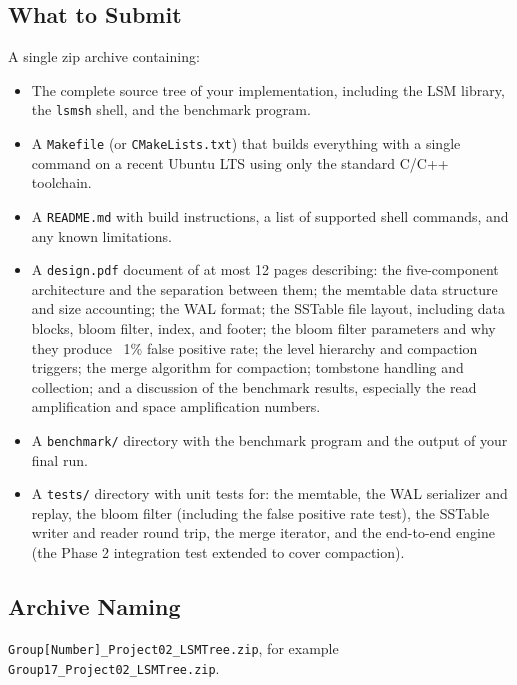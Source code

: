 \documentclass[11pt,a4paper]{article}
\begin{document}
\subsection{What to Submit}
A single zip archive containing:

\begin{itemize}
\item The complete source tree of your implementation, including the LSM library, the \texttt{lsmsh} shell, and the benchmark program.

\item A \texttt{Makefile} (or \texttt{CMakeLists.txt}) that builds everything with a single command on a recent Ubuntu LTS using only the standard C/C++ toolchain.

\item A \texttt{README.md} with build instructions, a list of supported shell commands, and any known limitations.

\item A \texttt{design.pdf} document of at most 12 pages describing: the five-component architecture and the separation between them; the memtable data structure and size accounting; the WAL format; the SSTable file layout, including data blocks, bloom filter, index, and footer; the bloom filter parameters and why they produce ~1\% false positive rate; the level hierarchy and compaction triggers; the merge algorithm for compaction; tombstone handling and collection; and a discussion of the benchmark results, especially the read amplification and space amplification numbers.

\item A \texttt{benchmark/} directory with the benchmark program and the output of your final run.

\item A \texttt{tests/} directory with unit tests for: the memtable, the WAL serializer and replay, the bloom filter (including the false positive rate test), the SSTable writer and reader round trip, the merge iterator, and the end-to-end engine (the Phase 2 integration test extended to cover compaction).
\end{itemize}

\subsection{Archive Naming}
\texttt{Group[Number]\_Project02\_LSMTree.zip}, for example \texttt{Group17\_Project02\_LSMTree.zip}.
\end{document}
